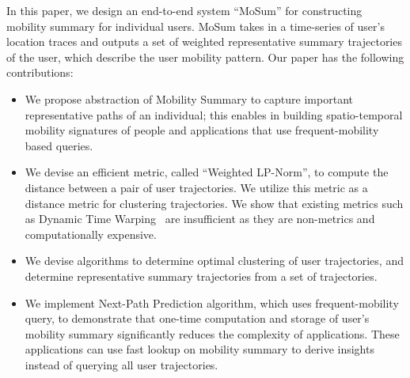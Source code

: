 In this paper, we design an end-to-end system ``MoSum'' for constructing mobility summary for individual users. MoSum takes in a time-series of user's location traces and outputs a set of weighted representative summary trajectories of the user, which describe the user mobility pattern. 
Our paper has the following contributions:
\begin{itemize}
\item We propose abstraction of Mobility Summary to capture important representative paths of an individual; this enables in building spatio-temporal mobility signatures of people and applications that use frequent-mobility based queries.
\item We devise an efficient metric, called ``Weighted LP-Norm'', to compute the distance between a pair of user trajectories. We utilize this metric as a distance metric for clustering trajectories. We show that existing metrics such as Dynamic Time Warping~\cite{Yi1998} are insufficient as they are non-metrics and computationally expensive.
\item We devise algorithms to determine optimal clustering of user trajectories, and determine representative summary trajectories from a set of trajectories.
\item We implement Next-Path Prediction algorithm, which uses frequent-mobility query, to demonstrate that one-time computation and storage of user's mobility summary significantly reduces the complexity of applications. These applications can use fast lookup on mobility summary to derive insights instead of querying all user trajectories. 
\end{itemize}

